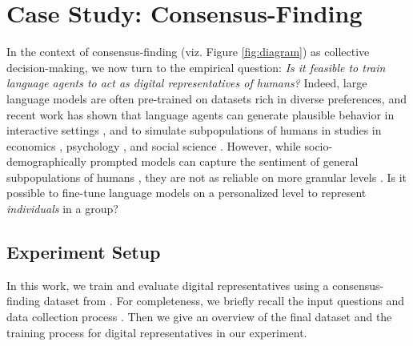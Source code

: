\section{Case Study: Consensus-Finding}\label{sec:4}

In the context of consensus-finding (viz. Figure \ref{fig:diagram}) as collective decision-making, we now turn to the empirical question:
%
\textit{Is it feasible to train language agents to act as digital representatives of humans?}
%
Indeed, large language models are often pre-trained on datasets rich in diverse preferences, and
%
recent work has shown that language agents can generate plausible behavior in interactive settings \cite{park2023generative}, and
%
to simulate subpopulations of humans in studies in
economics \cite{horton2023large},
psychology \cite{aher2023using}, and
social science \cite{argyle2023out}.
%
However, while socio-demographically prompted models can capture the sentiment of general subpopulations of humans \cite{santurkar2023whose,simmons2022moral}, they are not as reliable on more granular levels \cite{beck2023not,harding2023ai}. Is it possible to fine-tune language models on a personalized level to represent \textit{individuals} in a group?

\subsection{Experiment Setup}

In this work, we train and evaluate digital representatives using a consensus-finding dataset from \cite{tessler2023submit}. For completeness, we briefly recall the input questions and data collection process \cite{tessler2023submit}. Then we give an overview of the final dataset and the training process for digital representatives in our experiment.


